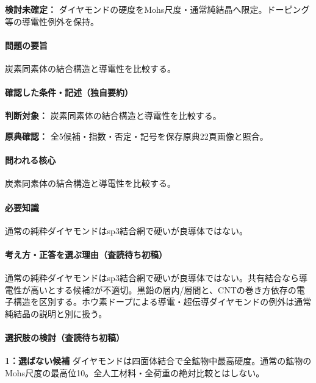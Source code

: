 \par\textbf{検討未確定：} ダイヤモンドの硬度をMohs尺度・通常純結晶へ限定。ドーピング等の導電性例外を保持。

\paragraph{問題の要旨} 炭素同素体の結合構造と導電性を比較する。

\paragraph{確認した条件・記述（独自要約）}\mbox{}\par

\noindent\textbf{判断対象：} 炭素同素体の結合構造と導電性を比較する。\par

\noindent\textbf{原典確認：} 全5候補・指数・否定・記号を保存原典22頁画像と照合。\par

\paragraph{問われる核心} 炭素同素体の結合構造と導電性を比較する。

\paragraph{必要知識} 通常の純粋ダイヤモンドはsp3結合網で硬いが良導体ではない。

\paragraph{考え方・正答を選ぶ理由（査読待ち初稿）} 通常の純粋ダイヤモンドはsp3結合網で硬いが良導体ではない。共有結合なら導電性が高いとする候補2が不適切。黒鉛の層内/層間と、CNTの巻き方依存の電子構造を区別する。ホウ素ドープによる導電・超伝導ダイヤモンドの例外は通常純結晶の説明と別に扱う。

\paragraph{選択肢の検討（査読待ち初稿）}\mbox{}\par

\noindent\textbf{1：選ばない候補} ダイヤモンドは四面体結合で全鉱物中最高硬度。通常の鉱物のMohs尺度の最高位10。全人工材料・全荷重の絶対比較とはしない。\par

